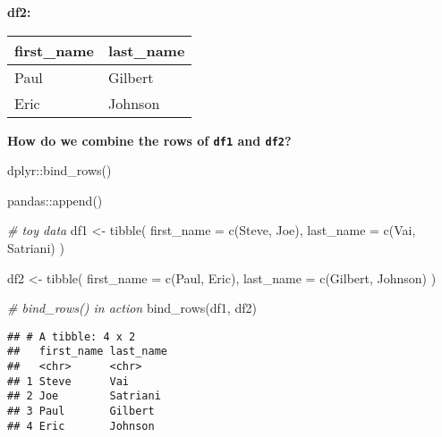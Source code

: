 \documentclass[
]{book}
\newenvironment{Shaded}{\begin{snugshade}}{\end{snugshade}}
\newcommand{\AttributeTok}[1]{\textcolor[rgb]{0.77,0.63,0.00}{#1}}
\newcommand{\CommentTok}[1]{\textcolor[rgb]{0.56,0.35,0.01}{\textit{#1}}}
\newcommand{\FunctionTok}[1]{\textcolor[rgb]{0.00,0.00,0.00}{#1}}
\newcommand{\NormalTok}[1]{#1}
\newcommand{\OtherTok}[1]{\textcolor[rgb]{0.56,0.35,0.01}{#1}}
\newcommand{\StringTok}[1]{\textcolor[rgb]{0.31,0.60,0.02}{#1}}
\begin{document}
\textbf{df2:}

\begin{longtable}[]{@{}ll@{}}
\toprule
first\_name & last\_name \\
\midrule
\endhead
Paul & Gilbert \\
Eric & Johnson \\
\bottomrule
\end{longtable}

\textbf{How do we combine the rows of \texttt{df1} and \texttt{df2}?}

dplyr::bind\_rows()

pandas::append()

\begin{Shaded}
\begin{Highlighting}[]
\CommentTok{\# toy data}
\NormalTok{df1 }\OtherTok{\textless{}{-}} \FunctionTok{tibble}\NormalTok{(}
    \AttributeTok{first\_name =} \FunctionTok{c}\NormalTok{(}\StringTok{\textquotesingle{}Steve\textquotesingle{}}\NormalTok{, }\StringTok{\textquotesingle{}Joe\textquotesingle{}}\NormalTok{),}
    \AttributeTok{last\_name =} \FunctionTok{c}\NormalTok{(}\StringTok{\textquotesingle{}Vai\textquotesingle{}}\NormalTok{, }\StringTok{\textquotesingle{}Satriani\textquotesingle{}}\NormalTok{)}
\NormalTok{)}

\NormalTok{df2 }\OtherTok{\textless{}{-}} \FunctionTok{tibble}\NormalTok{(}
    \AttributeTok{first\_name =} \FunctionTok{c}\NormalTok{(}\StringTok{\textquotesingle{}Paul\textquotesingle{}}\NormalTok{, }\StringTok{\textquotesingle{}Eric\textquotesingle{}}\NormalTok{),}
    \AttributeTok{last\_name =} \FunctionTok{c}\NormalTok{(}\StringTok{\textquotesingle{}Gilbert\textquotesingle{}}\NormalTok{, }\StringTok{\textquotesingle{}Johnson\textquotesingle{}}\NormalTok{)}
\NormalTok{)}
\end{Highlighting}
\end{Shaded}

\begin{Shaded}
\begin{Highlighting}[]
\CommentTok{\# bind\_rows() in action}
\FunctionTok{bind\_rows}\NormalTok{(df1, df2)}
\end{Highlighting}
\end{Shaded}

\begin{verbatim}
## # A tibble: 4 x 2
##   first_name last_name
##   <chr>      <chr>    
## 1 Steve      Vai      
## 2 Joe        Satriani 
## 3 Paul       Gilbert  
## 4 Eric       Johnson
\end{verbatim}
\end{document}
